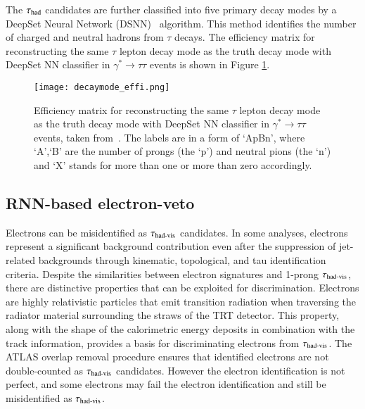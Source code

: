         The $\tau_{\text{had}}$ candidates are further classified into five primary decay modes by a DeepSet Neural Network (DSNN)~\cite{zaheer2018deepsets} algorithm.
        This method identifies the number of charged and neutral hadrons from $\tau$ decays. The efficiency matrix for reconstructing the same $\tau$ 
        lepton decay mode as the truth decay mode with DeepSet NN classifier in $\gamma^*\rightarrow\tau\tau$ events is shown in Figure \ref{fig:tau_decay_mode_eff}.
        \begin{figure}[htbp]
            \centering
            \texttt{[image: decaymode\_effi.png]}
            \caption{
                Efficiency matrix for reconstructing the same $\tau$ lepton decay mode as the truth decay mode with DeepSet NN classifier 
                in $\gamma^*\rightarrow\tau\tau$ events, taken from~\cite{ATL-PHYS-PUB-2022-044}.
                The labels are in a form of `ApBn', where `A',`B' are the number of prongs (the `p') 
                and neutral pions (the `n') and `X' stands for more than one or more than zero accordingly.
            }
            \label{fig:tau_decay_mode_eff}
        \end{figure}

    \subsection{RNN-based electron-veto}
        Electrons can be misidentified as $\tau_{\text{had-vis}}$ candidates. In some analyses, 
        electrons represent a significant background contribution even after the suppression of jet-related 
        backgrounds through kinematic, topological, and tau identification criteria. Despite the similarities 
        between electron signatures and 1-prong \(\tau_{\text{had-vis}}\), there are distinctive properties 
        that can be exploited for discrimination.
        Electrons are highly relativistic particles that emit transition radiation when traversing the 
        radiator material surrounding the straws of the TRT detector. This property, along with the 
        shape of the calorimetric energy deposits in combination with the track information, provides 
        a basis for discriminating electrons from \(\tau_{\text{had-vis}}\). The ATLAS overlap removal procedure
        ensures that identified electrons are not double-counted as $\tau_{\text{had-vis}}$ candidates. However
        the electron identification is not perfect, and some electrons may fail the electron identification and
        still be misidentified as $\tau_{\text{had-vis}}$.

